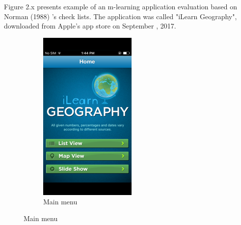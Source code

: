 Figure 2.x presents example of an m-learning application evaluation based on Norman (1988) \cite{norman1988psychology}'s check lists. The application was called "iLearn Geography", downloaded from Apple's app store on September , 2017. 

\begin{figure}[!hbt]\centering
    \begin{subfigure}{0.25\textwidth}
\includegraphics[width=\textwidth]{design1}
\caption{Main menu}
    \end{subfigure}\hspace{0.05\textwidth}

\end{figure}
